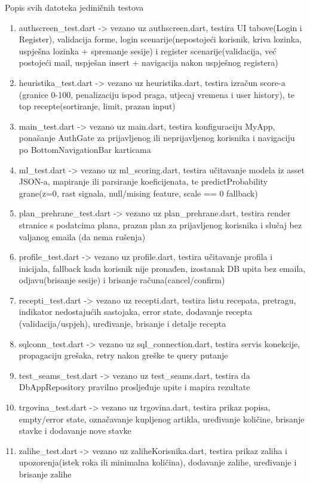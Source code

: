 \documentclass[diplomskirad]{fer}
\begin{document}
Popis svih datoteka jediničnih testova
\begin{enumerate}
    \item authscreen\_test.dart -> vezano uz authscreen.dart, testira UI tabove(Login i Register), validacija forme, login scenarije(nepostojeći korisnik, kriva lozinka, uspješna lozinka + spremanje sesije) i register scenarije(validacija, već postojeći mail, uspješan insert + navigacija nakon uspješnog registera)
    \item heuristika\_test.dart -> vezano uz heuristika.dart, testira izračun score-a (granice 0-100, penalizaciju ispod praga, utjecaj vremena i user history), te top recepte(sortiranje, limit, prazan input)
    \item main\_test.dart -> vezano uz main.dart, testira konfiguraciju MyApp, ponašanje AuthGate za prijavljenog ili neprijavljenog korisnika i navigaciju po BottomNavigationBar karticama
    \item ml\_test.dart -> vezano uz ml\_scoring.dart, testira učitavanje modela iz asset JSON-a, mapiranje ili parsiranje koeficijenata, te predictProbability grane(z=0, rast signala, null/mising feature, scale == 0 fallback)
    \item plan\_prehrane\_test.dart -> vezano uz plan\_prehrane.dart, testira render stranice s podatcima plana, prazan plan za prijavljenog korisnika i slučaj bez valjanog emaila (da nema rušenja)
    \item profile\_test.dart -> vezano uz profile.dart, testira učitavanje profila i inicijala, fallback kada korisnik nije pronađen, izostanak DB upita bez emaila, odjavu(brisanje sesije) i brisanje računa(cancel/confirm)
    \item recepti\_test.dart -> vezano uz recepti.dart, testira listu recepata, pretragu, indikator nedostajućih sastojaka, error state, dodavanje recepta (validacija/uspjeh), uređivanje, brisanje i detalje recepta
    \item sqlconn\_test.dart -> vezano uz sql\_connection.dart, testira servis konekcije, propagaciju grešaka, retry nakon greške te query putanje
    \item test\_seams\_test.dart -> vezano uz test\_seams.dart, testira da DbAppRepository pravilno prosljeđuje upite i mapira rezultate
    \item trgovina\_test.dart -> vezano uz trgovina.dart, testira prikaz popisa, empty/error state, označavanje kupljenog artikla, uređivanje količine, brisanje stavke i dodavanje nove stavke
    \item zalihe\_test.dart -> vezano uz zaliheKorisnika.dart, testira prikaz zaliha i upozorenja(istek roka ili minimalna količina), dodavanje zalihe, uređivanje i brisanje zalihe
\end{enumerate}
\end{document}
